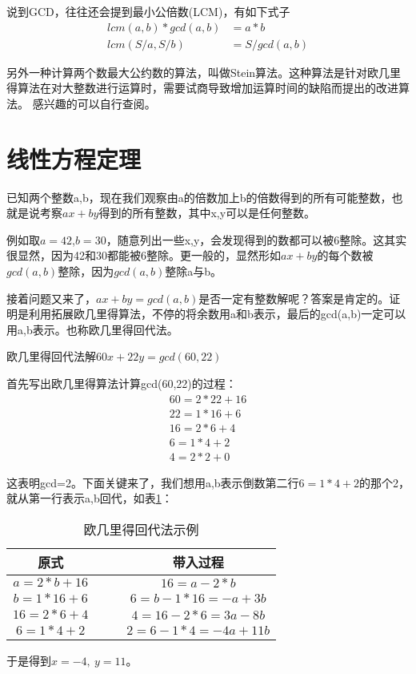 

说到GCD，往往还会提到最小公倍数(LCM)，有如下式子
\begin{align*}
lcm(a,b) * gcd(a,b) &=a*b \\
lcm(S/a, S/b) &= S/gcd(a, b)
\end{align*}

\begin{note}
另外一种计算两个数最大公约数的算法，叫做{\heiti Stein算法}。这种算法是针对欧几里得算法在对大整数进行运算时，需要试商导致增加运算时间的缺陷而提出的改进算法。
感兴趣的可以自行查阅。
\end{note}


\section{线性方程定理}

已知两个整数a,b，现在我们观察由a的倍数加上b的倍数得到的所有可能整数，也就是说{\heiti 考察$ax+by$得到的所有整数}，其中x,y可以是任何整数。

例如取$a=42$,$b=30$，随意列出一些x,y，会发现得到的数都可以被6整除。这其实很显然，因为42和30都能被6整除。更一般的，{\heiti 显然形如$ax+by$的每个数被$gcd(a,b)$整除}，因为$gcd(a,b)$整除a与b。

接着问题又来了，$ax+by=gcd(a,b)$是否一定有整数解呢？答案是肯定的。证明是利用{\heiti 拓展欧几里得算法}，不停的将余数用a和b表示，{\heiti 最后的gcd(a,b)一定可以用a,b表示}。也称欧几里得回代法。

\begin{example}
欧几里得回代法解$60x+22y=gcd(60,22)$

首先写出欧几里得算法计算gcd(60,22)的过程：
\begin{align*}
60=2 * 22+16 \\
22=1 * 16+6 \\
16=2 * 6+4 \\
6=1 * 4+2 \\
4=2 * 2+0
\end{align*}

这表明gcd=2。下面关键来了，我们想用a,b表示倒数第二行$6=1*4+2$的那个2，就从第一行表示a,b回代，如表\ref{tab:欧几里得回代法示例}：

\begin{table}[!htbp]
	\centering
	\caption{欧几里得回代法示例}
	\begin{tabular}{cccc}
		\toprule
		原式  && & 带入过程  \\
		\midrule
		$a=2*b+16$&&  & $16=a-2*b$ \\
		$b=1*16+6$&& & $6=b-1*16=-a+3b$ \\
		$16=2*6+4$&& &  $4=16-2*6=3a-8b$ \\
		$6=1*4+2$ && & $2=6-1*4=-4a+11b$ \\
		\bottomrule
	\end{tabular}%
	\label{tab:欧几里得回代法示例}
\end{table}%
	
于是得到$x=-4, \ y=11$。

\end{example}

